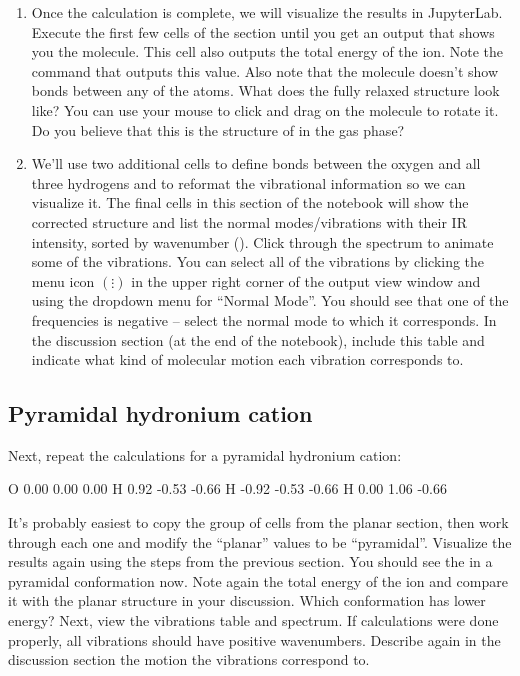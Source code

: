 \begin{enumerate}
  \item Once the calculation is complete, we will visualize the results in JupyterLab. 
  Execute the first few cells of the section until you get an output that shows you the molecule. 
  This cell also outputs the total energy of the ion. 
  Note the command that outputs this value. 
  Also note that the molecule doesn't show bonds between any of the atoms. 
  What does the fully relaxed structure look like? 
  You can use your mouse to click and drag on the molecule to rotate it. 
  Do you believe that this is the structure of  in the gas phase? 
  
  \item We'll use two additional cells to define bonds between the oxygen and all three hydrogens and to reformat the vibrational information so we can visualize it. 
  The final cells in this section of the notebook will show the corrected structure and list the normal modes/vibrations with their IR intensity, sorted by wavenumber (\unit{\wn}). 
  Click through the spectrum to animate some of the vibrations. 
  You can select all of the vibrations by clicking the menu icon \( (\vdots) \) in the upper right corner of the output view window and using the dropdown menu for ``Normal Mode''. 
  You should see that one of the frequencies is negative -- select the normal mode to which it corresponds. 
  In the discussion section (at the end of the notebook), include this table and indicate what kind of molecular motion each vibration corresponds to. 

\end{enumerate}


\subsection*{Pyramidal hydronium cation}

Next, repeat the calculations for a pyramidal hydronium cation: 
\begin{gaussinput}[title=Contents of \Verb{geom_pyramidal.xyz}]
O    0.00   0.00   0.00 
H    0.92  -0.53  -0.66 
H   -0.92  -0.53  -0.66 
H    0.00   1.06  -0.66 

\end{gaussinput}
It's probably easiest to copy the group of cells from the planar section, then work through each one and modify the ``planar'' values to be ``pyramidal''. 
Visualize the results again using the steps from the previous section. 
You should see the  in a pyramidal conformation now.  
Note again the total energy of the ion and compare it with the planar structure in your discussion. 
Which conformation has lower energy? 
Next, view the vibrations table and spectrum. 
If calculations were done properly, all vibrations should have positive wavenumbers. 
Describe again in the discussion section the motion the vibrations correspond to. 

